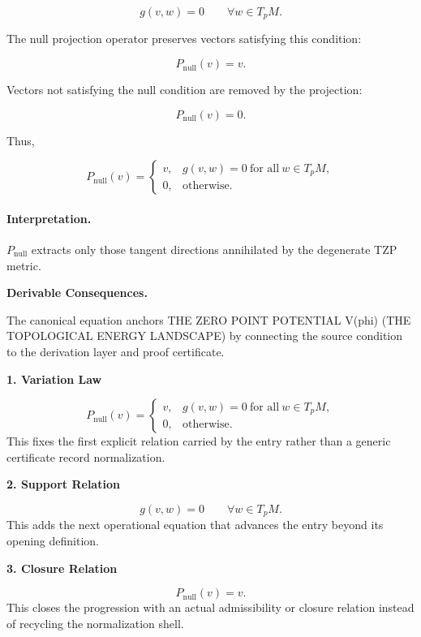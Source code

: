 \begin{equation}
g(v,w)=0
\qquad
\forall w\in T_pM .
\end{equation}

The null projection operator preserves vectors satisfying this condition:

\begin{equation}
P_{\mathrm{null}}(v)=v .
\end{equation}

Vectors not satisfying the null condition are removed by the projection:

\begin{equation}
P_{\mathrm{null}}(v)=0 .
\end{equation}

Thus,

\begin{equation}
\boxed{
P_{\mathrm{null}}(v)
=
\begin{cases}
v, & g(v,w)=0\ \text{for all}\ w\in T_pM,\\
0, & \text{otherwise}.
\end{cases}
}
\end{equation}

\paragraph{Interpretation.}
$P_{\mathrm{null}}$ extracts only those tangent directions annihilated by the degenerate TZP metric.

\par\vspace{0.35em}
\noindent\textbf{Derivable Consequences.}\quad
\begingroup
\footnotesize
\raggedright
The canonical equation anchors THE ZERO POINT POTENTIAL V(phi) (THE TOPOLOGICAL ENERGY LANDSCAPE) by connecting the source condition to the derivation layer and proof certificate.
\par\endgroup

\noindent\textbf{1. Variation Law}\par
\[
P_{\mathrm{null}}(v) = \begin{cases} v, & g(v,w)=0\ \text{for all}\ w\in T_pM,\\ 0, & \text{otherwise}. \end{cases}
\]
\noindent This fixes the first explicit relation carried by the entry rather than a generic certificate record normalization.\par
\noindent\textbf{2. Support Relation}\par
\[
g(v,w)=0 \qquad \forall w\in T_pM.
\]
\noindent This adds the next operational equation that advances the entry beyond its opening definition.\par
\noindent\textbf{3. Closure Relation}\par
\[
P_{\mathrm{null}}(v)=v.
\]
\noindent This closes the progression with an actual admissibility or closure relation instead of recycling the normalization shell.\par

